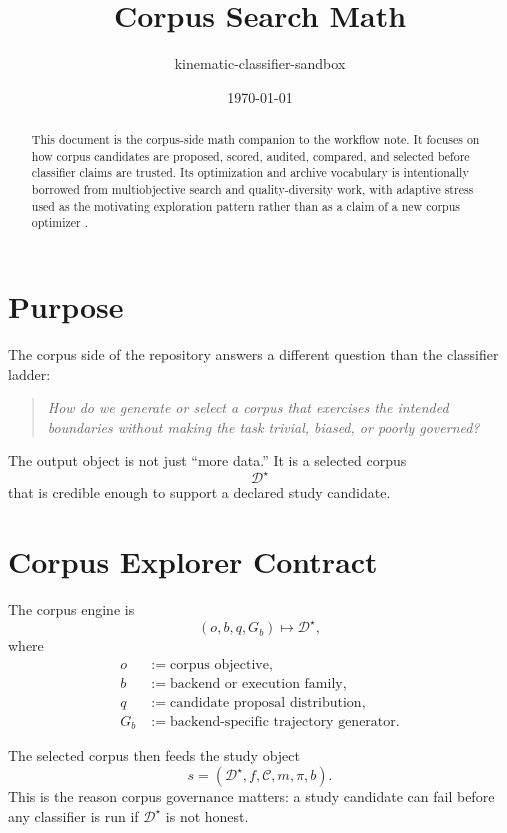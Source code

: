 \documentclass[11pt]{article}
\title{Corpus Search Math}
\author{kinematic-classifier-sandbox}
\date{\today}
\begin{document}
\maketitle

\begin{abstract}
This document is the corpus-side math companion to the workflow note. It focuses on how corpus candidates are proposed, scored, audited, compared, and selected before classifier claims are trusted. Its optimization and archive vocabulary is intentionally borrowed from multiobjective search and quality-diversity work, with adaptive stress used as the motivating exploration pattern rather than as a claim of a new corpus optimizer \cite{deb2002,mouret2015,corso2022}.
\end{abstract}

\section{Purpose}
The corpus side of the repository answers a different question than the classifier ladder:
\begin{quote}
\textit{How do we generate or select a corpus that exercises the intended boundaries without making the task trivial, biased, or poorly governed?}
\end{quote}

The output object is not just ``more data.'' It is a selected corpus
\begin{equation}
\mathcal{D}^{\star}
\end{equation}
that is credible enough to support a declared study candidate.

\section{Corpus Explorer Contract}
The corpus engine is
\begin{equation}
(o, b, q, G_b) \mapsto \mathcal{D}^{\star},
\end{equation}
where
\begin{align}
o &:= \text{corpus objective}, \\
b &:= \text{backend or execution family}, \\
q &:= \text{candidate proposal distribution}, \\
G_b &:= \text{backend-specific trajectory generator}.
\end{align}

The selected corpus then feeds the study object
\begin{equation}
s = (\mathcal{D}^{\star}, f, \mathcal{C}, m, \pi, b).
\end{equation}
This is the reason corpus governance matters: a study candidate can fail before any classifier is run if \(\mathcal{D}^{\star}\) is not honest.
\end{document}

